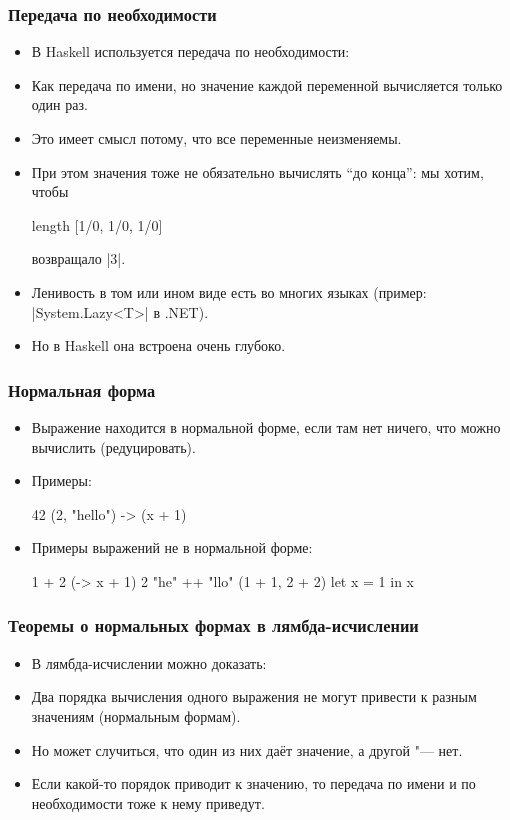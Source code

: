 \documentclass[11pt]{beamer}
\begin{document}
\begin{frame}[fragile]
  \frametitle{Передача по необходимости}
  \begin{itemize}
    \item В Haskell используется передача по необходимости:
    \item Как передача по имени, но значение каждой переменной вычисляется только один раз.
          \pause
    \item Это имеет смысл потому, что все переменные неизменяемы.
          \pause
    \item При этом значения тоже не обязательно вычислять \enquote{до конца}: мы хотим, чтобы
          \begin{haskell}
            length [1/0, 1/0, 1/0]
          \end{haskell}
          возвращало \haskinline|3|.
          \pause
    \item Ленивость в том или ином виде есть во многих языках (пример: \haskinline|System.Lazy<T>| в .NET).
    \item Но в Haskell она встроена очень глубоко.
  \end{itemize}
\end{frame}

\begin{frame}[fragile]
  \frametitle{Нормальная форма}
  \begin{itemize}
    \item Выражение находится в нормальной форме, если там нет ничего, что можно вычислить (редуцировать).
    \item Примеры: \pause
          \begin{haskell}
            42
            (2, "hello")
            \x -> (x + 1)
          \end{haskell}
    \item Примеры выражений не в нормальной форме: \pause
          \begin{haskell}
            1 + 2                 
            (\x -> x + 1) 2       
            "he" ++ "llo"         
            (1 + 1, 2 + 2)
            let x = 1 in x
          \end{haskell}
  \end{itemize}
\end{frame}

\begin{frame}[fragile]
  \frametitle{Теоремы о нормальных формах в лямбда-исчислении}
  \begin{itemize}
    \item В лямбда-исчислении можно доказать:
    \item Два порядка вычисления одного выражения не могут привести к разным значениям (нормальным формам).
    \item Но может случиться, что один из них даёт значение, а другой "--- нет.
    \item Если какой-то порядок приводит к значению, то передача по имени и по необходимости тоже к нему приведут.
  \end{itemize}
\end{frame}
\end{document}
